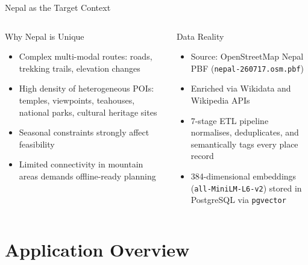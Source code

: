 \documentclass[aspectratio=169,professionalfonts]{beamer}
\begin{document}
\begin{frame}{Nepal as the Target Context}
  \begin{columns}[T]
    \begin{block}{Why Nepal is Unique}
      \begin{itemize}
        \item Complex multi-modal routes: roads, trekking trails, elevation changes
        \item High density of heterogeneous POIs: temples, viewpoints, teahouses,
              national parks, cultural heritage sites
        \item Seasonal constraints strongly affect feasibility
        \item Limited connectivity in mountain areas demands offline-ready planning
      \end{itemize}
    \end{block}

    \begin{alertblock}{Data Reality}
      \begin{itemize}
        \item Source: OpenStreetMap Nepal PBF (\texttt{nepal-260717.osm.pbf})
        \item Enriched via Wikidata and Wikipedia APIs
        \item 7-stage ETL pipeline normalises, deduplicates, and
              semantically tags every place record
        \item 384-dimensional embeddings (\texttt{all-MiniLM-L6-v2}) stored
              in PostgreSQL via \texttt{pgvector}
      \end{itemize}
    \end{alertblock}
  \end{columns}
\end{frame}

\section{Application Overview}
\end{document}
